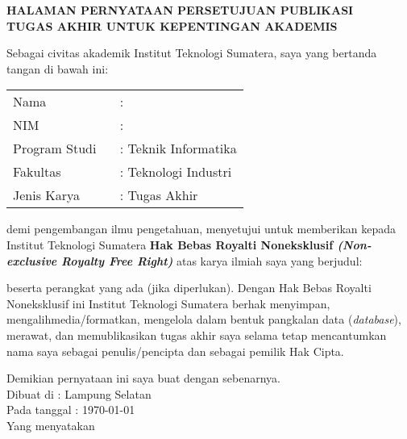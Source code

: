 \clearpage
{}%

\begin{center}
	\smallskip
	
	\normalsize \bfseries \MakeUppercase{
		HALAMAN PERNYATAAN PERSETUJUAN PUBLIKASI \\
		TUGAS AKHIR UNTUK KEPENTINGAN AKADEMIS
	}\linebreak
	
	\normalfont \onehalfspacing \justifying %
	Sebagai civitas akademik Institut Teknologi Sumatera, saya yang bertanda tangan di bawah ini:
	
	\flushleft
	\setlength{\tabcolsep}{0pt}
	\begin{tabular}{l l}
		Nama 			&  : \theauthor\\
		NIM 			&  : \printnim\\
		Program Studi \	&  : Teknik Informatika\\
		Fakultas 		&  : Teknologi Industri\\
		Jenis Karya 	&  : Tugas Akhir\\
	\end{tabular}

	\justifying
	\noindent demi pengembangan ilmu pengetahuan, menyetujui untuk memberikan kepada Institut Teknologi Sumatera \textbf{Hak Bebas Royalti Noneksklusif \textit{(Non-exclusive Royalty Free Right)}} atas karya ilmiah saya yang berjudul:
	
	\centering
	\textbf{\thetitle}
	
	\justifying
	beserta perangkat yang ada (jika diperlukan). Dengan Hak Bebas Royalti Noneksklusif ini Institut Teknologi Sumatera berhak menyimpan, mengalihmedia/formatkan, mengelola dalam bentuk pangkalan data (\textit{database}), merawat, dan memublikasikan tugas akhir saya selama tetap mencantumkan nama saya sebagai penulis/pencipta dan sebagai pemilik Hak Cipta.
	
	Demikian pernyataan ini saya buat dengan sebenarnya. \\
	
	\centering
	Dibuat di : Lampung Selatan\\
	Pada tanggal : \today\\ %
	\bigskip
	Yang menyatakan\\
	\vspace{1.5cm}
	\theauthor
	
\end{center}
\clearpage
